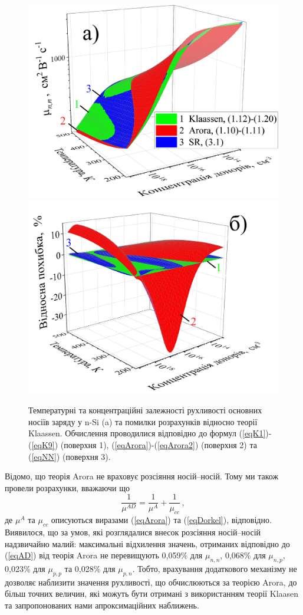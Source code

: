 \documentclass[12pt,a4paper,titlepage,oneside]{book}
\numberwithin{equation}{part}
\begin{document}
\begin{figure}
	\centering
     \includegraphics[width=0.49\linewidth]{Fig37a.png}\kern 20pt
     \includegraphics[width=0.49\linewidth]{Fig37b.png}
	  \caption{Температурні та концентраційні залежності рухливості основних носіїв заряду у n-Si (a) 
       та помилки розрахунків відносно теорії Klaassen. 
       Обчислення проводилися відповідно до формул (\ref{eqK1})-(\ref{eqK9}) (поверхня 1), 
       (\ref{eqArora})-(\ref{eqArora2}) (поверхня 2)  та (\ref{eqNN}) (поверхня 3).
}\label{figLast}
\end{figure}

Відомо, що теорія Arora не враховує розсіяння носій--носій. 
Тому ми також провели розрахунки, вважаючи що 
\begin{equation}\label{eqAD}
  \frac{1}{\mu^{AD}}= \frac{1}{\mu^A}+\frac{1}{\mu_{cc}}\,,
\end{equation}
де
$\mu^A$ та $\mu_{cc}$ описуються виразами (\ref{eqArora}) та (\ref{eqDorkel}), відповідно.
Виявилося, що за умов, які розглядалися внесок розсіяння носій--носій надзвичайно малий:
максимальні відхилення значень, отриманих відповідно до (\ref{eqAD}) від теорія Arora
не перевищують 0,059\% для $\mu_{n,n}$, 0,068\% для $\mu_{n,p}$, 0,023\% для $\mu_{p,p}$ та 
0,028\% для $\mu_{p,n}$.
Тобто, врахування додаткового механізму не дозволяє наблизити значення рухливості,
що обчислюються за теорією Arora, до більш точних величин, які можуть бути отримані з використанням теорії Klaasen
та запропонованих нами апроксимаційних наближень.
\end{document}
